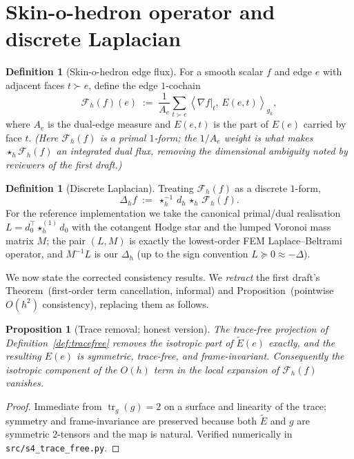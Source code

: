 \documentclass[11pt]{article}
\theoremstyle{plain}
\newtheorem{proposition}[theorem]{Proposition}
\theoremstyle{definition}
\newtheorem{definition}[theorem]{Definition}
\theoremstyle{remark}
\newcommand{\tr}{\operatorname{tr}}
\newcommand{\Lap}{\Delta}
\newcommand{\dext}{d_h}
\newcommand{\hodge}{\star_h}
\newcommand{\inner}[2]{\left\langle #1,\, #2 \right\rangle}
\newcommand{\Order}{O}
\begin{document}
\section{Skin-o-hedron operator and discrete Laplacian}
\label{sec:operator}
\begin{definition}[Skin-o-hedron edge flux]
For a smooth scalar $f$ and edge $e$ with adjacent faces $t\succ e$, define the
edge $1$-cochain
\[
\mathcal{F}_h(f)(e) \;:=\; \frac{1}{A_e}\sum_{t\succ e}
   \inner{\nabla f|_t}{E(e,t)}_{g_k},
\]
where $A_e$ is the dual-edge measure and $E(e,t)$ is the part of $E(e)$ carried
by face $t$. \emph{(Here $\mathcal{F}_h(f)$ is a primal $1$-form; the $1/A_e$
weight is what makes $\hodge \mathcal{F}_h(f)$ an integrated dual flux, removing the
dimensional ambiguity noted by reviewers of the first draft.)}
\end{definition}

\begin{definition}[Discrete Laplacian]
Treating $\mathcal{F}_h(f)$ as a discrete $1$-form,
\[
\Lap_h f \;:=\; \hodge^{-1}\,\dext\,\hodge\,\mathcal{F}_h(f).
\]
For the reference implementation we take the canonical primal/dual realisation
$L=d_0^{\!\top}\hodge^{(1)} d_0$ with the cotangent Hodge star and the lumped
Voronoi mass matrix $M$; the pair $(L,M)$ is exactly the lowest-order FEM
Laplace--Beltrami operator, and $M^{-1}L$ is our $\Lap_h$ (up to the sign
convention $L\succeq 0\approx-\Lap$).
\end{definition}

We now state the corrected consistency results. We \emph{retract} the first
draft's Theorem~(first-order term cancellation, informal) and
Proposition~(pointwise $\Order(h^2)$ consistency), replacing them as follows.

\begin{proposition}[Trace removal; honest version]
\label{prop:trace}
The trace-free projection of Definition~\ref{def:tracefree} removes the isotropic
part of $\widetilde{E}(e)$ exactly, and the resulting $E(e)$ is symmetric,
trace-free, and frame-invariant. Consequently the \emph{isotropic} component of
the $\Order(h)$ term in the local expansion of $\mathcal{F}_h(f)$ vanishes.
\end{proposition}
\begin{proof}
Immediate from $\tr_{g}(g)=2$ on a surface and linearity of the trace; symmetry
and frame-invariance are preserved because both $\widetilde E$ and $g$ are
symmetric $2$-tensors and the map is natural. Verified numerically in
\texttt{src/s4\_trace\_free.py}.
\end{proof}
\end{document}

